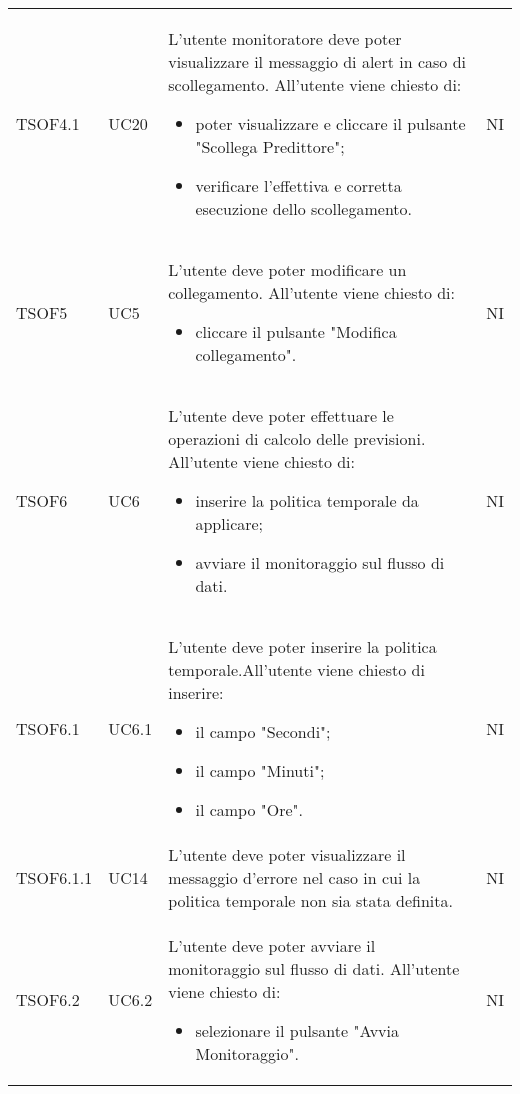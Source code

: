 \begin{longtable}{C{2.5cm} C{2.5cm} L{8cm} C{2cm}}
TSOF4.1 &
UC20 &
L'utente monitoratore deve poter visualizzare il messaggio di alert in caso di scollegamento. All'utente viene chiesto di:
\begin{itemize}
	\item poter visualizzare e cliccare il pulsante "Scollega Predittore";
	\item verificare l'effettiva e corretta esecuzione dello scollegamento.
\end{itemize}&
NI \\


TSOF5 & UC5 & L'utente deve poter modificare un collegamento. \newline All'utente viene chiesto di: \begin{itemize}
\item cliccare il pulsante "Modifica collegamento".
\end{itemize} & NI \\
TSOF6 & UC6 & L'utente deve poter effettuare le operazioni di calcolo delle previsioni. \newline
All'utente viene chiesto di: \begin{itemize}
\item inserire la politica temporale da applicare;
\item avviare il monitoraggio sul flusso di dati.
\end{itemize}& NI \\
TSOF6.1 & UC6.1 & L'utente deve poter inserire la politica temporale.\newline All'utente viene chiesto di inserire: \begin{itemize}
\item il campo "Secondi";
\item il campo "Minuti";
\item il campo "Ore".
\end{itemize} & NI \\
TSOF6.1.1 & UC14 & L'utente deve poter visualizzare il messaggio d’errore nel caso in cui la politica temporale non sia stata definita. & NI \\
TSOF6.2 & UC6.2 & L'utente deve poter avviare il monitoraggio sul flusso di dati. \newline All'utente viene chiesto di: \begin{itemize}
\item selezionare il pulsante "Avvia Monitoraggio".
\end{itemize} & NI \\

\end{longtable}
